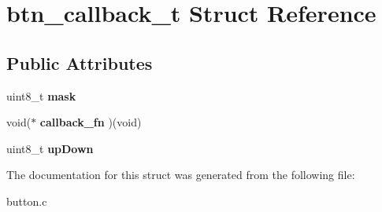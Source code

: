 \hypertarget{structbtn__callback__t}{\section{btn\+\_\+callback\+\_\+t Struct Reference}
\label{structbtn__callback__t}
}
\subsection*{Public Attributes}
\begin{DoxyCompactItemize}
\item 
\hypertarget{structbtn__callback__t_ae21b258e5e11a353e8fa463af6b8fbf9}{uint8\+\_\+t {\bfseries mask}}\label{structbtn__callback__t_ae21b258e5e11a353e8fa463af6b8fbf9}

\item 
\hypertarget{structbtn__callback__t_a28a5db703cfe1e85384f6ccde9a7a6ae}{void($\ast$ {\bfseries callback\+\_\+fn} )(void)}\label{structbtn__callback__t_a28a5db703cfe1e85384f6ccde9a7a6ae}

\item 
\hypertarget{structbtn__callback__t_a9bf7471dcd273a148e397ea3680ca3d7}{uint8\+\_\+t {\bfseries up\+Down}}\label{structbtn__callback__t_a9bf7471dcd273a148e397ea3680ca3d7}

\end{DoxyCompactItemize}


The documentation for this struct was generated from the following file\+:\begin{DoxyCompactItemize}
\item 
button.\+c\end{DoxyCompactItemize}
